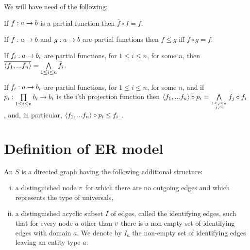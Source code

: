 We will have need of the following:
\begin{lemma}
\label{restrictionleftid}
If $f: a \rightarrow b$ is a partial function then $\bar{f} \circ f = f$.
\end{lemma}

\begin{lemma}
\label{inequalityiffrestriction}
If $f: a \rightarrow b$ and  $g: a \rightarrow b$ are partial functions then $f \leq g$ iff $\bar{f}\circ g= f$.
\end{lemma}

\begin{lemma}
\label{tuplerestriction}
If $f_i: a \rightarrow b_i$ are partial functions, for $1 \leq i \leq n$, for some $n$, then $\overline{\langle f_1,...f_n\rangle}=\bigwedge\limits_{1 \leq i \leq n}{\bar{f_i}}$.
\end{lemma}

\begin{lemma}
\label{tupleprojection}
If $f_i: a \rightarrow b_i$ are partial functions, for $1 \leq i \leq n$, for some $n$, and if 
$p_i : \prod\limits_{1 \leq i \leq n}{b_i} \rightarrow b_i$ is the i'th projection function 
then  $\tuple{f_1,...f_n} \circ p_i = \bigwedge\limits_{\genfrac{}{}{0pt}{}{1 \leq j \leq n}{ j \neq i}}{\bar{f_j}}\circ f_i$, and,
in particular, $\langle f_1,...f_n\rangle \circ p_i\leq f_i$ .
\end{lemma}


\section{Definition of ER model}

\begin{definition}
An  $S$ is a directed graph having the following additional structure:
\begin{enumerate} [(i)]
\item{a distinguished node $v$ for which there are no outgoing edges and which represents the type of universals, }
\item{a distinguished acyclic subset $I$ of edges, called the identifying edges, such that
for every node $a$ other than $v$ there is a non-empty set  of identifying edges with domain $a$.
 We denote by $I_a$ the non-empty set of identifying edges leaving an entity type $a$.}
\end{enumerate}
\end{definition}

